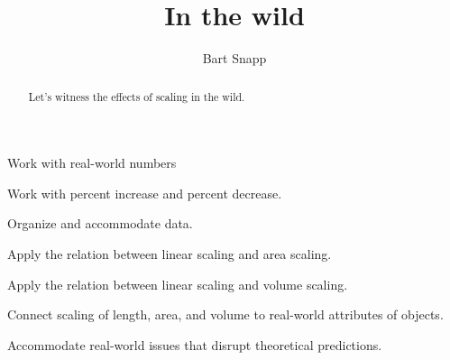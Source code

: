 \documentclass[nooutcomes,noauthor,handout]{ximera}
\title{In the wild}
\author{Bart Snapp}
\begin{document}
\begin{abstract}
  Let's witness the effects of scaling in the wild.
\end{abstract}
\maketitle


\begin{listOutcomes}
\item Work with real-world numbers
\item Work with percent increase and percent decrease.
\item Organize and accommodate data.
\item Apply the relation between linear scaling and area scaling.
\item Apply the relation between linear scaling and volume scaling.
\item Connect scaling of length, area, and volume to real-world
  attributes of objects.
\item Accommodate real-world issues that disrupt theoretical predictions.
\end{listOutcomes}





\mynewpage
\end{document}

